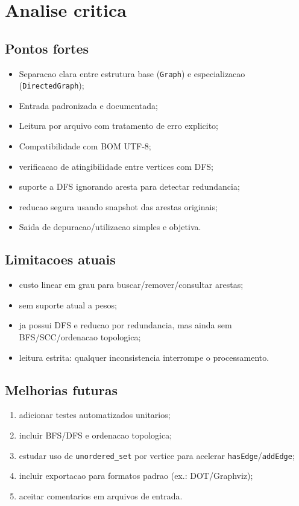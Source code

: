 \documentclass[12pt,a4paper]{article}
\begin{document}
\section{Analise critica}
\subsection{Pontos fortes}
\begin{itemize}
    \item Separacao clara entre estrutura base (\texttt{Graph}) e especializacao (\texttt{DirectedGraph});
    \item Entrada padronizada e documentada;
    \item Leitura por arquivo com tratamento de erro explicito;
    \item Compatibilidade com BOM UTF-8;
    \item verificacao de atingibilidade entre vertices com DFS;
    \item suporte a DFS ignorando aresta para detectar redundancia;
    \item reducao segura usando snapshot das arestas originais;
    \item Saida de depuracao/utilizacao simples e objetiva.
\end{itemize}

\subsection{Limitacoes atuais}
\begin{itemize}
    \item custo linear em grau para buscar/remover/consultar arestas;
    \item sem suporte atual a pesos;
    \item ja possui DFS e reducao por redundancia, mas ainda sem BFS/SCC/ordenacao topologica;
    \item leitura estrita: qualquer inconsistencia interrompe o processamento.
\end{itemize}

\subsection{Melhorias futuras}
\begin{enumerate}
    \item adicionar testes automatizados unitarios;
    \item incluir BFS/DFS e ordenacao topologica;
    \item estudar uso de \texttt{unordered\_set} por vertice para acelerar \texttt{hasEdge}/\texttt{addEdge};
    \item incluir exportacao para formatos padrao (ex.: DOT/Graphviz);
    \item aceitar comentarios em arquivos de entrada.
\end{enumerate}
\end{document}
